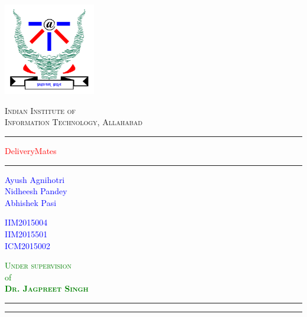\documentclass{report}
\begin{document}
 

\begin{titlepage}
	\centering
	\includegraphics[width=4cm]{logo.png}\\[.5cm]
	{\scshape\LARGE Indian Institute of \\Information Technology, Allahabad \par}
	\vspace{1cm}
	\rule{\textwidth}{2pt}	
	\vspace{0.1\textheight}
		
	\textcolor{Red}{ 
		{\fontsize{35}{42}\selectfont DeliveryMates}\\[0.5\baselineskip]
	}
	
	\vspace{0.185\textheight} 
	
	\rule{0.3\textwidth}{0.4pt} 
	\begin{multicols}{3} 
	\textcolor{Blue}{
		\begin{flushleft} 
		{\large Ayush Agnihotri}\\[5pt] 
		{\large Nidheesh Pandey}\\[5pt]
		{\large Abhishek Pasi}\\[5pt]
		\end{flushleft}
		}
		\columnbreak
		 
	\textcolor{Blue}{
		\begin{flushleft} 
		{\large IIM2015004}\\[5pt] 
		{\large IIM2015501}\\[5pt]
		{\large ICM2015002}\\[5pt]
		\end{flushleft}
		}
		\columnbreak

	\textcolor{Green}{
		\begin{flushright}
		{\Large \textsc{Under supervision}}\\
		{\large of}\\
		{\Large \textsc{\textbf{Dr. Jagpreet Singh}}}
		\end{flushright}
		}
	\end{multicols}
	\vspace{0.065\textheight} 
	
\hfill


	\rule{\textwidth}{0.4pt} %
	
	\vspace{2pt}\vspace{-\baselineskip} %
	
	\rule{\textwidth}{2pt} %
	
\end{titlepage}
\pagebreak
\end{document}
